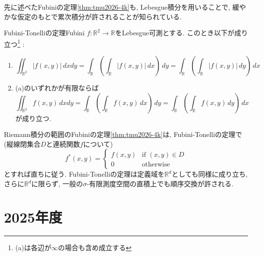 \documentclass[titlepage]{jsarticle}
\numberwithin{equation}{section}
\newcommand{\R}{\mathbb{R}}%
\begin{document}
先に述べたFubiniの定理\ref{thm:tmu2026-4k}も, Lebesgue積分を用いることで, 緩やかな仮定のもとで累次積分が許されることが知られている.
\begin{thm}{Fubini-Tonelliの定理}{Fubini}
$f : \R^2 \to \R$をLebesgue可測とする. このとき以下が成り立つ\footnote{(a)は各辺が$\infty$の場合も含め成立する} :
\begin{enumerate}[label = (\alph*)]
\item 
\[
\iint_{\R^2} |f(x, y)|\,dxdy = \int_{\R} \left(\int_\R|f(x, y)|\,dx\right)\,dy = \int_\R \left(\int_\R|f(x, y)|\,dy\right)\,dx
\]
\item (a)のいずれかが有限ならば
\[
\iint_{\R^2} f(x, y)\,dxdy = \int_\R \left(\int_\R f(x, y)\,dx\right)\,dy = \int_\R \left(\int_\R f(x, y)\,dy\right)\,dx
\]
が成り立つ.
\end{enumerate}
\end{thm}
Riemann積分の範囲のFubiniの定理\ref{thm:tmu2026-4k}は, Fubini-Tonelliの定理で (縦線閉集合$D$と連続関数$f$について)
\[
f^*(x, y) = 
\begin{cases}
f(x, y) & \text{if}\,\,(x, y) \in D\\
0 & \text{otherwise}
\end{cases}
\]
とすれば直ちに従う. Fubini-Tonelliの定理は定義域を$\R^d$としても同様に成り立ち, さらに$\R^d$に限らず, 一般の$\sigma$-有限測度空間の直積上でも順序交換が許される.
\section{2025年度}
\end{document}
